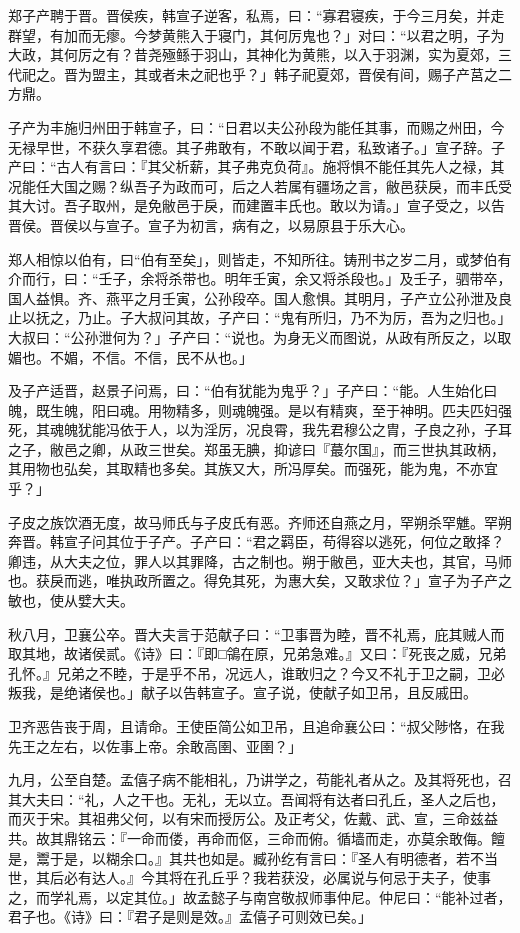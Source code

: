 \documentclass[]{article}
\begin{document}
郑子产聘于晋。晋侯疾，韩宣子逆客，私焉，曰：``寡君寝疾，于今三月矣，并走群望，有加而无瘳。今梦黄熊入于寝门，其何厉鬼也？」对曰：``以君之明，子为大政，其何厉之有？昔尧殛鲧于羽山，其神化为黄熊，以入于羽渊，实为夏郊，三代祀之。晋为盟主，其或者未之祀也乎？」韩子祀夏郊，晋侯有间，赐子产莒之二方鼎。

子产为丰施归州田于韩宣子，曰：``日君以夫公孙段为能任其事，而赐之州田，今无禄早世，不获久享君德。其子弗敢有，不敢以闻于君，私致诸子。」宣子辞。子产曰：``古人有言曰：『其父析薪，其子弗克负荷』。施将惧不能任其先人之禄，其况能任大国之赐？纵吾子为政而可，后之人若属有疆场之言，敝邑获戾，而丰氏受其大讨。吾子取州，是免敝邑于戾，而建置丰氏也。敢以为请。」宣子受之，以告晋侯。晋侯以与宣子。宣子为初言，病有之，以易原县于乐大心。

郑人相惊以伯有，曰``伯有至矣」，则皆走，不知所往。铸刑书之岁二月，或梦伯有介而行，曰：``壬子，余将杀带也。明年壬寅，余又将杀段也。」及壬子，驷带卒，国人益惧。齐、燕平之月壬寅，公孙段卒。国人愈惧。其明月，子产立公孙泄及良止以抚之，乃止。子大叔问其故，子产曰：``鬼有所归，乃不为厉，吾为之归也。」大叔曰：``公孙泄何为？」子产曰：``说也。为身无义而图说，从政有所反之，以取媚也。不媚，不信。不信，民不从也。」

及子产适晋，赵景子问焉，曰：``伯有犹能为鬼乎？」子产曰：``能。人生始化曰魄，既生魄，阳曰魂。用物精多，则魂魄强。是以有精爽，至于神明。匹夫匹妇强死，其魂魄犹能冯依于人，以为淫厉，况良霄，我先君穆公之胄，子良之孙，子耳之子，敝邑之卿，从政三世矣。郑虽无腆，抑谚曰『蕞尔国』，而三世执其政柄，其用物也弘矣，其取精也多矣。其族又大，所冯厚矣。而强死，能为鬼，不亦宜乎？」

子皮之族饮酒无度，故马师氏与子皮氏有恶。齐师还自燕之月，罕朔杀罕魋。罕朔奔晋。韩宣子问其位于子产。子产曰：``君之羁臣，苟得容以逃死，何位之敢择？卿违，从大夫之位，罪人以其罪降，古之制也。朔于敝邑，亚大夫也，其官，马师也。获戾而逃，唯执政所置之。得免其死，为惠大矣，又敢求位？」宣子为子产之敏也，使从嬖大夫。

秋八月，卫襄公卒。晋大夫言于范献子曰：``卫事晋为睦，晋不礼焉，庇其贼人而取其地，故诸侯贰。《诗》曰：『即□鴒在原，兄弟急难。』又曰：『死丧之威，兄弟孔怀。』兄弟之不睦，于是乎不吊，况远人，谁敢归之？今又不礼于卫之嗣，卫必叛我，是绝诸侯也。」献子以告韩宣子。宣子说，使献子如卫吊，且反戚田。

卫齐恶告丧于周，且请命。王使臣简公如卫吊，且追命襄公曰：``叔父陟恪，在我先王之左右，以佐事上帝。余敢高圉、亚圉？」

九月，公至自楚。孟僖子病不能相礼，乃讲学之，苟能礼者从之。及其将死也，召其大夫曰：``礼，人之干也。无礼，无以立。吾闻将有达者曰孔丘，圣人之后也，而灭于宋。其祖弗父何，以有宋而授厉公。及正考父，佐戴、武、宣，三命兹益共。故其鼎铭云：『一命而偻，再命而伛，三命而俯。循墙而走，亦莫余敢侮。饘是，鬻于是，以糊余口。』其共也如是。臧孙纥有言曰：『圣人有明德者，若不当世，其后必有达人。』今其将在孔丘乎？我若获没，必属说与何忌于夫子，使事之，而学礼焉，以定其位。」故孟懿子与南宫敬叔师事仲尼。仲尼曰：``能补过者，君子也。《诗》曰：『君子是则是效。』孟僖子可则效已矣。」
\end{document}
